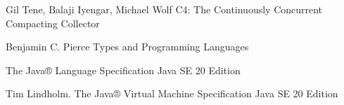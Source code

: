 \begingroup 
\renewcommand{\section}[2]{\anonsection{Библиографический список}}
\begin{flushleft}
\begin{thebibliography}{}

    Gil Tene, Balaji Iyengar, Michael Wolf C4: The Continuously Concurrent Compacting Collector

	Benjamin C. Pierce Types and Programming Languages

	The Java® Language Specification Java SE 20 Edition 

	Tim Lindholm. The Java® Virtual Machine Specification Java SE 20 Edition
\end{thebibliography}
\end{flushleft}
\endgroup

\clearpage
